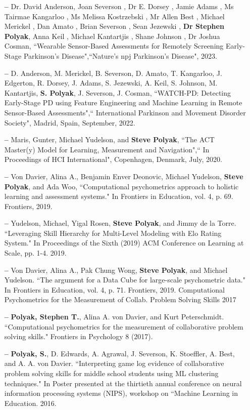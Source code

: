 \documentclass{my_cv}
\begin{document}
\begin{itemize}[leftmargin=10pt]

    \item[\textbf{--}] Dr. David Anderson, Joan Severson , Dr E. Dorsey , Jamie Adams , Ms Tairmae Kangarloo , Ms Melissa Kostrzebski , Mr Allen Best , Michael Merickel , Dan Amato , Brian Severson , Sean Jezewski , \textbf{Dr Stephen Polyak}, Anna Keil , Michael Kantartjis , Shane Johnson , Dr Joshua Cosman, ``Wearable Sensor-Based Assessments for Remotely Screening Early-Stage Parkinson’s Disease",``Nature’s npj Parkinson’s Disease", 2023.
    \item[\textbf{--}] D. Anderson, M. Merickel, B. Severson, D. Amato, T. Kangarloo, J. Edgerton, R. Dorsey, J. Adams, S. Jezewski, A. Keil, S. Johnson, M. Kantartjis, \textbf{S. Polyak}, J. Severson, J. Cosman, ``WATCH-PD: Detecting Early-Stage PD using Feature Engineering and Machine Learning in Remote Sensor-Based Assessments",`` International Parkinson and Movement Disorder Society", Madrid, Spain, September, 2022.
    \item[\textbf{--}] Maris, Gunter, Michael Yudelson, and \textbf{Steve Polyak}, ``The ACT Master(y) Model for Learning, Measurement and Navigation",`` In Proceedings of HCI International", Copenhagen, Denmark, July, 2020.
    \item[\textbf{--}] Von Davier, Alina A., Benjamin Enver Deonovic, Michael Yudelson, \textbf{Steve Polyak}, and Ada Woo, ``Computational psychometrics approach to holistic learning and assessment systems." In Frontiers in Education, vol. 4, p. 69. Frontiers, 2019.
    \item[\textbf{--}]  Yudelson, Michael, Yigal Rosen, \textbf{Steve Polyak}, and Jimmy de la Torre. ``Leveraging Skill Hierarchy for Multi-Level Modeling with Elo Rating System." In Proceedings of the Sixth (2019) ACM Conference on Learning at Scale, pp. 1-4. 2019.
    \item[\textbf{--}] Von Davier, Alina A., Pak Chung Wong, \textbf{Steve Polyak}, and Michael Yudelson. ``The argument for a Data Cube for large-scale psychometric data." In Frontiers in Education, vol. 4, p. 71. Frontiers, 2019. Computational Psychometrics for the Measurement of Collab. Problem Solving Skills 2017
    \item[\textbf{--}] \textbf{Polyak, Stephen T.}, Alina A. von Davier, and Kurt Peterschmidt. ``Computational psychometrics for the measurement of collaborative problem solving skills." Frontiers in Psychology 8 (2017).
    \item[\textbf{--}] \textbf{Polyak, S.}, D. Edwards, A. Agrawal, J. Severson, K. Stoeffler, A. Best, and A. A. von Davier. ``Interpreting game log evidence of collaborative problem solving skills for middle school students using ML clustering techniques." In Poster presented at the thirtieth annual conference on neural information processing systems (NIPS), workshop on “Machine Learning in Education. 2016.
\end{itemize}
\end{document}
